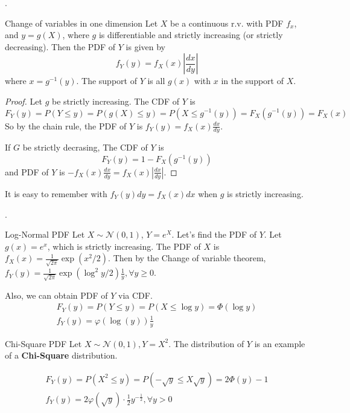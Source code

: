 \documentclass[8pt]{beamer}
\newcommand{\mc}[1]{\mathcal{#1}}
\newcommand{\tb}[1]{\textbf{#1}}
\newcommand{\abs}[1]{\left\lvert #1 \right\rvert}
\begin{document}
\begin{frame}{.}

    \begin{theorem}{Change of variables in one dimension}
        Let $X$ be a continuous r.v. with PDF $f_x$, and $y = g(X)$, where $g$ is differentiable and strictly increasing (or strictly decreasing). Then the PDF of $Y$ is given by
        \[
        f_Y (y) = f_X (x) \abs{\frac{dx}{dy}}
        \]
        where $x = g^{-1}(y)$. The support of $Y$ is all $g(x)$ with $x$ in the support of $X$.
    \end{theorem}

    \begin{proof}
        Let $g$ be strictly increasing. The CDF of $Y$ is 
        \[
            F_Y(y) = P(Y \leq y) = P(g(X) \leq y) = P(X \leq g^{-1}(y)) = F_X(g^{-1}(y)) = F_X(x)
        \]
        So by the chain rule, the PDF of $Y$ is $f_Y(y) = f_X(x)\frac{dx}{dy}$.

        If $G$ be strictly decrasing, The CDF of $Y$ is 
        \[
            F_Y(y) = 1- F_X(g^{-1}(y))
        \]
        and PDF of $Y$ is $- f_X(x) \frac{dx}{dy} = f_X(x) \abs{\frac{dx}{dy}}$.
    \end{proof}
    It is easy to remember with $f_Y(y) dy = f_X(x)dx$ when $g$ is strictly increasing.
\end{frame}

\begin{frame}{.}
    \begin{example}{Log-Normal PDF}
        Let $X \sim \mc{N}(0,1)$, $Y = e^X$. Let's find the PDF of $Y$. Let $g(x) = e^x$, which is strictly increasing. The PDF of $X$ is $f_X(x) = \frac{1}{\sqrt{2\pi}} \exp{(x^2/2)}$. Then by the Change of variable theorem, $f_Y(y) = \frac{1}{\sqrt{2\pi}} \exp{(\log^2 y / 2)}\frac{1}{y}, \forall y \geq 0$.

        Also, we can obtain PDF of $Y$ via CDF.
        \[
        \begin{gathered}
            F_Y (y) = P(Y \leq y) = P(X \leq \log{y}) = \Phi(\log{y}) \\
            f_Y (y) = \varphi(\log (y)) \frac{1}{y}
        \end{gathered}
        \]
    \end{example}

    \begin{example}{Chi-Square PDF}
        Let $X \sim \mc{N}(0,1), Y = X^2$. The distribution of $Y$ is an example of a \tb{Chi-Square} distribution.

        \[
        \begin{gathered}
            F_Y(y) = P(X^2 \leq y) = P(-\sqrt{y} \leq X \sqrt{y}) = 2 \Phi(y) - 1 \\
            f_Y(y) = 2 \varphi(\sqrt{y}) \cdot \frac{1}{2} y^{-\frac{1}{2}}, \forall y>0
        \end{gathered}
        \]
    \end{example}
\end{frame}
\end{document}
